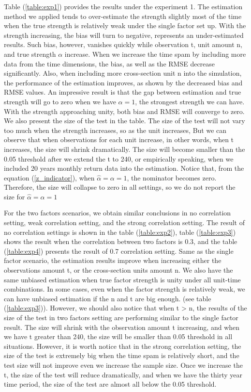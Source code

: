 Table (\ref{table:exp1}) provides the results under the experiment 1.
The estimation method we applied tends to over-estimate the strength slightly most of the time when the true strength is relatively weak under the single factor set up.
With the strength increasing, the bias will turn to negative, represents an under-estimated results.
Such bias, however, vanishes quickly while observation t, unit amount n, and true strength $\alpha$ increase.
When we increase the time spam by including more data from the time dimensions, the bias, as well as the RMSE decrease significantly.
Also, when including more cross-section unit n into the simulation, the performance of the estimation improves, as shown by the decreased bias and RMSE values.
An impressive result is that the gap between estimation and true strength will go to zero when we have $\alpha = 1$, the strongest strength we can have.
With the strength approaching unity, both bias and RMSE will converge to zero.
We also present the size of the test in the table.
The size of the test will not vary too much when the strength increases, so as the unit increases,
But we can observe that when observations for each unit increase, in other words, when t increases, the size will shrink dramatically.
The size will become smaller than the 0.05 threshold after we extend the t to 240, or empirically speaking, when we included 20 years monthly return data into the estimation.
Notice that, from the equation (\ref{z_indicator}), when $\hat{\alpha} = \alpha = 1$, the nominator becomes zero.
Therefore, the size will collapse to zero in all settings, so we do not report the size for $\hat{\alpha} = \alpha = 1$

For the two factors scenarios, we obtain similar conclusions in no correlation setting, weak correlation setting, and the strong correlation setting.
The result of no correlation settings is shown in the table (\ref{table:exp2}), table (\ref{table:exp3}) shows the result when the correlation between two factors is 0.3, and the table (\ref{table:exp4}) presents the result of 0.7 correlation setting.
Same as the single factor scenario, the estimation results improve when increasing either the observations amount t, or the cross-section units amount n.
We also have the same unbiased estimation when true factor strength is unity under all unit-time combinations.
In some cases, even when the factor strength is relatively weak, we can have unbiased estimation if the n and t are big enough. (see table (\ref{table:exp3})).
However, we should also notice that when t > n, the results of the size of the test in two factors setting are performing similar to the single factor result. 
The size will shrink with the observation amount t increasing, and when we have t greater than 240, the size will be smaller than 0.05 threshold in all situations.
However, it is worth notice that in the strong correlation setting, the size of the test is extremely big when the time spam is relatively short, and the test size will not improve even we increase the sample size.
Once we increase the t, the size of the test will reduce dramatically, and when we have the thirty year time period, the size of the test are almost all below the 0.05 threshold.

